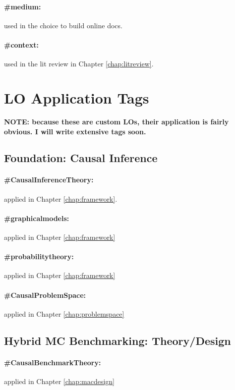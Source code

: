 \documentclass[./main.tex]{subfiles}
\begin{document}
\paragraph*{\textbf{\#medium:}}\label{hc:medium} used in the choice to build online docs.
\paragraph*{\textbf{\#context:}}\label{hc:context} used in the lit review in Chapter \ref{chap:litreview}.

\section{LO Application Tags}

\textbf{NOTE: because these are custom LOs, their application is fairly obvious. I will write extensive tags soon.}

\subsection{Foundation: Causal Inference}
\paragraph*{\textbf{\#CausalInferenceTheory:}}\label{lo:CausalInferenceTheory} applied in Chapter \ref{chap:framework}.
\paragraph*{\textbf{\#graphicalmodels:}}\label{lo:graphicalmodels} applied in Chapter \ref{chap:framework}
\paragraph*{\textbf{\#probabilitytheory:}}\label{lo:probabilitytheory} applied in Chapter \ref{chap:framework}
\paragraph*{\textbf{\#CausalProblemSpace:}}\label{lo:CausalProblemSpace} applied in Chapter \ref{chap:problemspace}


\subsection{Hybrid MC Benchmarking: Theory/Design}
\paragraph*{\textbf{\#CausalBenchmarkTheory:}}\label{lo:CausalBenchmarkTheory} applied in Chapter \ref{chap:macdesign}
\end{document}
